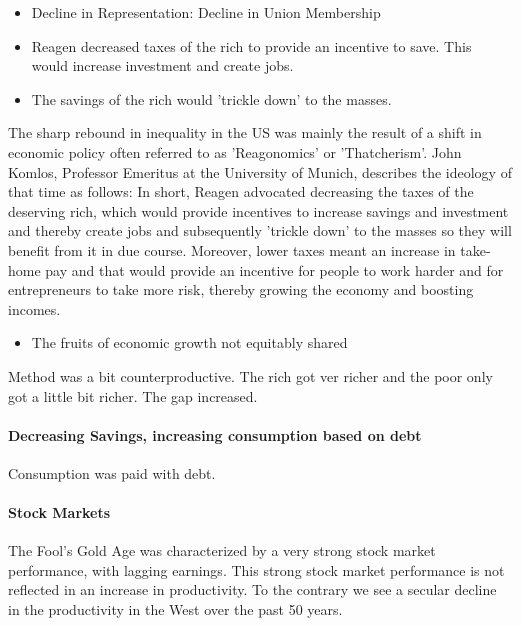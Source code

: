 \begin{itemize}
    \item Decline in Representation: Decline in Union Membership
    \item Reagen decreased taxes of the rich to provide an incentive to
        save. This would increase investment and create jobs.
    \item The savings of the rich would 'trickle down' to the masses.
\end{itemize}

The sharp rebound in inequality in the US was mainly the result of a shift in
economic policy often referred to as 'Reagonomics' or 'Thatcherism'. John
Komlos, Professor Emeritus at the University of Munich, describes the ideology
of that time as follows: In short, Reagen advocated decreasing the taxes
of the deserving rich, which would provide incentives to increase savings
and investment and thereby create jobs and subsequently 'trickle down' to
the masses so they will benefit from it in due course. Moreover, lower taxes
meant an increase in take-home pay and that would provide an incentive for
people to work harder and for entrepreneurs to take more risk, thereby growing
the economy and boosting incomes.

\begin{itemize}
    \item The fruits of economic growth not equitably shared
\end{itemize}

Method was a bit counterproductive. The rich got ver richer and the poor
only got a little bit richer. The gap increased.

\paragraph{Decreasing Savings, increasing consumption based on debt}

Consumption was paid with debt.

\paragraph{Stock Markets}

The Fool's Gold Age was characterized by a very strong stock market
performance, with lagging earnings. This strong stock market performance
is not reflected in an increase in productivity. To the contrary we see
a secular decline in the productivity in the West over the past 50 years.

